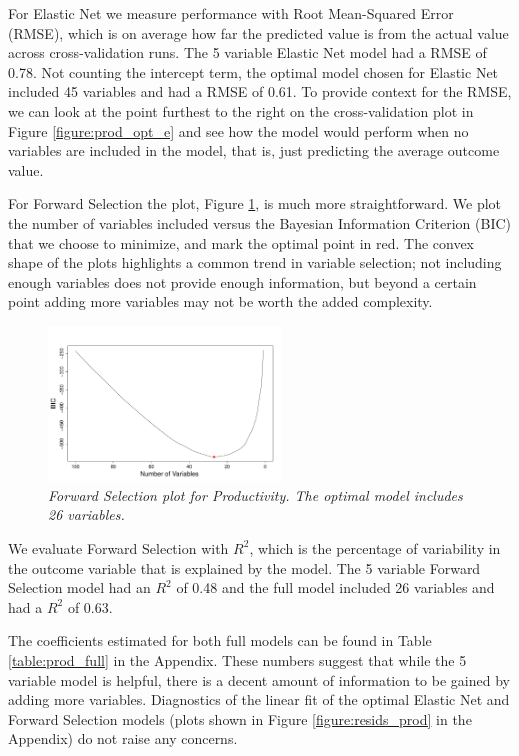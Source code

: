 \documentclass{article}
\begin{document}
For Elastic Net we measure performance with Root Mean-Squared Error (RMSE), which is on average how far the predicted 
value is from the actual value across cross-validation runs. The 5 variable Elastic Net model had a RMSE of 0.78. Not counting 
the intercept term, the optimal model chosen for Elastic Net included 45 variables and had a RMSE of 0.61. To provide context 
for the RMSE, we can look at the point furthest to the right on the cross-validation plot in Figure \ref{figure:prod_opt_e} and see 
how the model would perform when no variables are included in the model, that is, just predicting the average outcome value.

For Forward Selection the plot, Figure \ref{figure:prod_opt_f}, is much more straightforward. We plot the number of variables 
included versus the Bayesian Information Criterion (BIC) that we choose to minimize, and mark the optimal point in red. The 
convex shape of the plots highlights a common trend in variable selection; not including enough variables does not provide 
enough information, but beyond a certain point adding more variables may not be worth the added complexity. 


\begin{figure}
\vspace*{-0.5cm}
\includegraphics[width=0.55\textwidth]{forward_nvars_production.pdf}
\setlength{\belowcaptionskip}{-20pt}
\caption{\textsl{\small Forward Selection plot for Productivity. The optimal model includes 26 variables.}}
\label{figure:prod_opt_f}
\end{figure}



We evaluate Forward Selection with $R^2$, which is the percentage of variability in the outcome variable that is explained by 
the model. The 5 variable Forward Selection model had an $R^2$ of 0.48 and the full model included 26 variables and had a 
$R^2$ of 0.63. 

The coefficients estimated for both full models can be found in Table \ref{table:prod_full} in the Appendix. These numbers 
suggest that while the 5 variable model is helpful, there is a decent amount of information to be 
gained by adding more variables. Diagnostics of the linear fit of the optimal Elastic Net and Forward Selection models (plots 
shown in Figure \ref{figure:resids_prod} in the Appendix) do not raise any concerns. 
\end{document}
